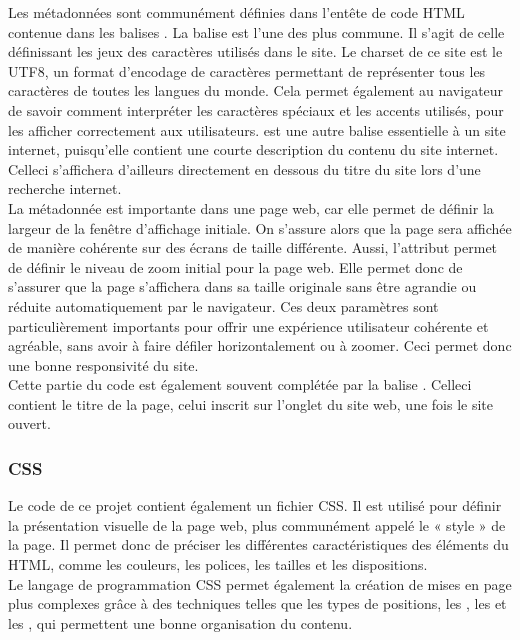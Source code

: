 \documentclass[a4,10pt,french]{sphinxmanual}
\begin{document}
\sphinxAtStartPar
Les métadonnées sont communément définies dans l’entête de code HTML contenue dans les balises .
La balise  est l’une des plus commune. Il s’agit de celle définissant les jeux des caractères utilisés dans le site. Le charset de ce site est le UTF\sphinxhyphen{}8, un format d’encodage de caractères permettant de représenter tous les caractères de toutes les langues du monde. Cela permet également au navigateur de savoir comment interpréter les caractères spéciaux et les accents utilisés, pour les afficher correctement aux utilisateurs.
 est une autre balise essentielle à un site internet, puisqu’elle contient une courte description du contenu du site internet. Celle\sphinxhyphen{}ci s’affichera d’ailleurs directement en dessous du titre du site lors d’une recherche internet.\\
La métadonnée  est importante dans une page web, car elle permet de définir la largeur de la fenêtre d’affichage initiale. On s’assure alors que la page sera affichée de manière cohérente sur des écrans de taille différente. Aussi, l’attribut  permet de définir le niveau de zoom initial pour la page web. Elle permet donc de s’assurer que la page s’affichera dans sa taille originale sans être agrandie ou réduite automatiquement par le navigateur. Ces deux paramètres sont particulièrement importants pour offrir une expérience utilisateur cohérente et agréable, sans avoir à faire défiler horizontalement ou à zoomer. Ceci permet donc une bonne responsivité du site.\\
Cette partie du code est également souvent complétée par la balise . Celle\sphinxhyphen{}ci contient le titre de la page, celui inscrit sur l’onglet du site web, une fois le site ouvert.


\subsubsection{CSS}
\label{\detokenize{chapitre-02:css}}
\sphinxAtStartPar
Le code de ce projet contient également un fichier CSS. Il est utilisé pour définir la présentation visuelle de la page web, plus communément appelé le « style » de la page. Il permet donc de préciser les différentes caractéristiques des éléments du HTML, comme les couleurs, les polices, les tailles et les dispositions.\\
Le langage de programmation CSS permet également la création de mises en page plus complexes grâce à des techniques telles que les types de positions, les , les  et les , qui permettent une bonne organisation du contenu.
\end{document}
